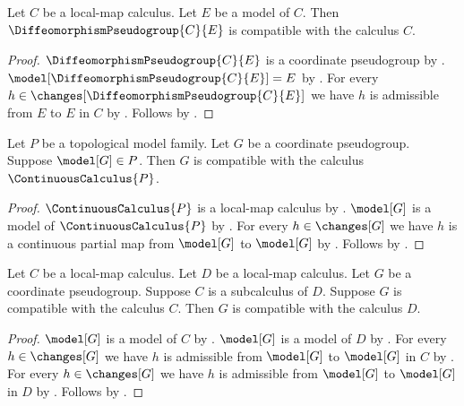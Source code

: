 \begin{classification}\label{diffeomorphism_pseudogroup_compatible}
    Let $C$ be a local-map calculus.
    Let $E$ be a model of $C$.
    Then $\DiffeomorphismPseudogroup{C}{E}$ is compatible with the calculus $C$.
\end{classification}
\begin{proof}
    $\DiffeomorphismPseudogroup{C}{E}$ is a coordinate pseudogroup by
        .
    $\model[\DiffeomorphismPseudogroup{C}{E}]=E$ by
        .
    For every $h\in\changes[\DiffeomorphismPseudogroup{C}{E}]$ we have
        $h$ is admissible from $E$ to $E$ in $C$ by
        .
    Follows by .
\end{proof}

\begin{classification}\label{pseudogroup_continuous_calculus_compatible}
    Let $P$ be a topological model family.
    Let $G$ be a coordinate pseudogroup.
    Suppose $\model[G]\in P$.
    Then $G$ is compatible with the calculus $\ContinuousCalculus{P}$.
\end{classification}
\begin{proof}
    $\ContinuousCalculus{P}$ is a local-map calculus by .
    $\model[G]$ is a model of $\ContinuousCalculus{P}$ by .
    For every $h\in\changes[G]$ we have
        $h$ is a continuous partial map from $\model[G]$ to $\model[G]$ by
        .
    Follows by .
\end{proof}

\begin{classification}\label{subcalculus_pseudogroup_compatible}
    Let $C$ be a local-map calculus.
    Let $D$ be a local-map calculus.
    Let $G$ be a coordinate pseudogroup.
    Suppose $C$ is a subcalculus of $D$.
    Suppose $G$ is compatible with the calculus $C$.
    Then $G$ is compatible with the calculus $D$.
\end{classification}
\begin{proof}
    $\model[G]$ is a model of $C$ by .
    $\model[G]$ is a model of $D$ by .
    For every $h\in\changes[G]$ we have
        $h$ is admissible from $\model[G]$ to $\model[G]$ in $C$ by
        .
    For every $h\in\changes[G]$ we have
        $h$ is admissible from $\model[G]$ to $\model[G]$ in $D$ by
        .
    Follows by .
\end{proof}

